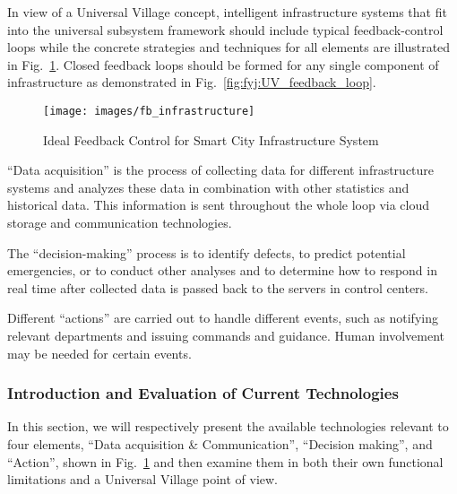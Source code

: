 \documentclass[letterpaper, twocolumn, 10pt, conference]{IEEEtran}
\begin{document}
In view of a Universal Village concept, intelligent infrastructure systems that fit into the universal subsystem framework should include typical feedback-control loops while the concrete strategies and techniques for all elements are illustrated in Fig.~\ref{fig:zlf:smart_infrastructure_feedback}. Closed feedback loops should be formed for any single component of infrastructure as demonstrated in Fig.~\ref{fig:fyj:UV_feedback_loop}.

\begin{figure}[h!]
        \centering
        \texttt{[image: images/fb\_infrastructure]}
        \caption{Ideal Feedback Control for Smart City Infrastructure System}
        \label{fig:zlf:smart_infrastructure_feedback}%
\end{figure}



\enquote{Data acquisition} is the process of collecting data for different infrastructure systems and analyzes these data in combination with other statistics and historical data. 
This information is sent throughout the whole loop via cloud storage and communication technologies.

The \enquote{decision-making} process is to identify defects, to predict potential emergencies, or to conduct other analyses  and to determine how to respond  in real time after collected data is passed back to the servers in control centers. 

Different \enquote{actions} are carried out to handle different events, such as notifying relevant departments and issuing commands and guidance. Human involvement may be needed for certain events. 

\subsubsection{Introduction and Evaluation of Current Technologies}
\label{sssec:zlf:smart_infrastructure:evaluation}


In this section, we will respectively present the available technologies relevant to four elements, \enquote{Data acquisition \& Communication}, \enquote{Decision making}, and  \enquote{Action},  shown in Fig.~\ref{fig:zlf:smart_infrastructure_feedback} and then examine them in both their own functional limitations and a Universal Village point of view.
\end{document}
